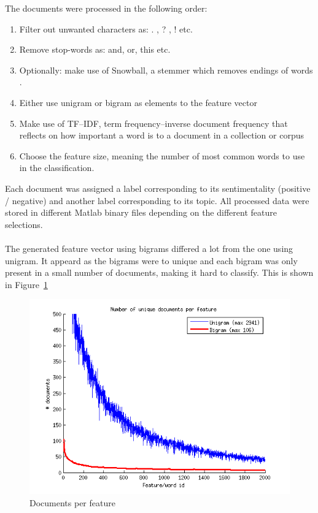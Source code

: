 The documents were processed in the following order:
\begin{enumerate}
\item Filter out unwanted characters as: . , ? , ! etc.
\item Remove stop-words as: and, or, this etc.
\item Optionally: make use of Snowball, a stemmer which removes endings of
words \citep{snowball_url}.
\item Either use unigram or bigram as elements to the feature vector
\item Make use of TF–IDF, term frequency–inverse document frequency that
reflects on how important a word is to a document in a collection or corpus
\item Choose the feature size, meaning the number of most common words to use
 in the classification.
\end{enumerate}
Each document was assigned a label corresponding to its sentimentality
(positive / negative) and another label corresponding to its topic.
All processed data were stored in different Matlab binary files depending on the
different feature selections.
\\\\
The generated feature vector using bigrams differed a lot from the one using
unigram. It appeard as the bigrams were to unique and each bigram was only
present in a small number of documents, making it hard to classify. This is
shown in Figure~\ref{fig:docperfeature}
\begin{figure}[h!]
\centering
        \includegraphics[scale = 0.6]{../Plottar/documents_per_feature.png}
\caption{Documents per feature}
\label{fig:docperfeature}
\end{figure}

